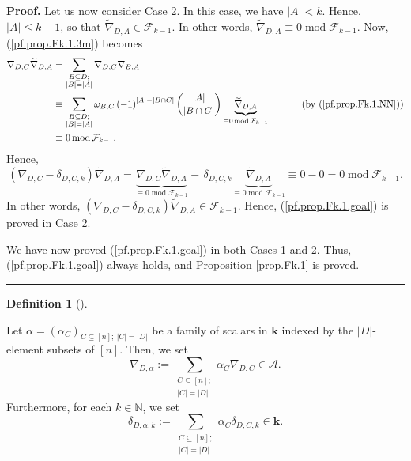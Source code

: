 \documentclass[numbers=enddot,12pt,final,onecolumn,notitlepage]{scrartcl}%
\numberwithin{exer}{subsection}
\theoremstyle{definition}
\newtheorem{defi}[theo]{Definition}
\newenvironment{definition}[1][]
{\begin{defi}[#1]\begin{leftbar}}
{\end{leftbar}\end{defi}}
\newenvironment{proof}[1][Proof]{\noindent\textbf{#1.} }{\ \rule{0.5em}{0.5em}}
\let\sumnonlimits\sum
\renewcommand{\sum}{\sumnonlimits\limits}
\begin{document}
\begin{proof}
Let us now consider Case 2. In this case, we have $\left\vert A\right\vert
<k$. Hence, $\left\vert A\right\vert \leq k-1$, so that $\widetilde{\nabla
}_{D,A}\in\mathcal{F}_{k-1}$. In other words, $\widetilde{\nabla}_{D,A}%
\equiv0\operatorname{mod}\mathcal{F}_{k-1}$. Now, (\ref{pf.prop.Fk.1.3m})
becomes%
\begin{align*}
\nabla_{D,C}\widetilde{\nabla}_{D,A}  &  =\sum\limits_{\substack{B\subseteq
D;\\\left\vert B\right\vert =\left\vert A\right\vert }}\nabla_{D,C}%
\nabla_{B,A}\\
&  \equiv\sum\limits_{\substack{B\subseteq D;\\\left\vert B\right\vert
=\left\vert A\right\vert }}\omega_{B,C}\left(  -1\right)  ^{\left\vert
A\right\vert -\left\vert B\cap C\right\vert }\dbinom{\left\vert A\right\vert
}{\left\vert B\cap C\right\vert }\underbrace{\widetilde{\nabla}_{D,A}}%
_{\equiv0\operatorname{mod}\mathcal{F}_{k-1}}\ \ \ \ \ \ \ \ \ \ \left(
\text{by (\ref{pf.prop.Fk.1.NN})}\right) \\
&  \equiv0\operatorname{mod}\mathcal{F}_{k-1}.
\end{align*}
Hence,%
\[
\left(  \nabla_{D,C}-\delta_{D,C,k}\right)  \widetilde{\nabla}_{D,A}%
=\underbrace{\nabla_{D,C}\widetilde{\nabla}_{D,A}}_{\equiv0\operatorname{mod}%
\mathcal{F}_{k-1}}-\,\delta_{D,C,k}\underbrace{\widetilde{\nabla}_{D,A}%
}_{\equiv0\operatorname{mod}\mathcal{F}_{k-1}}\equiv0-0=0\operatorname{mod}%
\mathcal{F}_{k-1}.
\]
In other words, $\left(  \nabla_{D,C}-\delta_{D,C,k}\right)  \widetilde{\nabla
}_{D,A}\in\mathcal{F}_{k-1}$. Hence, (\ref{pf.prop.Fk.1.goal}) is proved in
Case 2.

We have now proved (\ref{pf.prop.Fk.1.goal}) in both Cases 1 and 2. Thus,
(\ref{pf.prop.Fk.1.goal}) always holds, and Proposition \ref{prop.Fk.1} is proved.
\end{proof}

\begin{definition}
\label{def.NabDalpha}Let $\alpha=\left(  \alpha_{C}\right)  _{C\subseteq
\left[  n\right]  ;\ \left\vert C\right\vert =\left\vert D\right\vert }$ be a
family of scalars in $\mathbf{k}$ indexed by the $\left\vert D\right\vert
$-element subsets of $\left[  n\right]  $. Then, we set%
\[
\nabla_{D,\alpha}:=\sum_{\substack{C\subseteq\left[  n\right]  ;\\\left\vert
C\right\vert =\left\vert D\right\vert }}\alpha_{C}\nabla_{D,C}\in\mathcal{A}.
\]
Furthermore, for each $k\in\mathbb{N}$, we set%
\[
\delta_{D,\alpha,k}:=\sum_{\substack{C\subseteq\left[  n\right]  ;\\\left\vert
C\right\vert =\left\vert D\right\vert }}\alpha_{C}\delta_{D,C,k}\in
\mathbf{k}.
\]

\end{definition}
\end{document}

